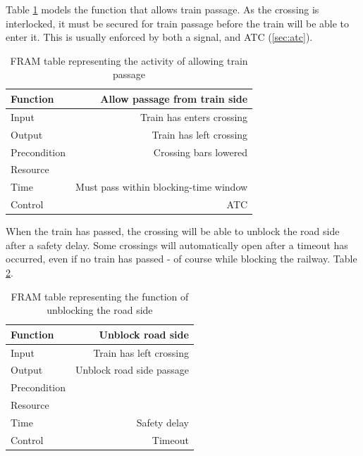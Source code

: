 \documentclass[10pt,oneside]{book}                  %
\begin{document}
Table \ref{table:function_allow_passage_from_train_side} models the function that allows train passage. As the crossing is interlocked, it must be secured for train passage before the train will be able to enter it. This is usually enforced by both a signal, and ATC (\ref{sec:atc}).

\begin{table}[h]
\centering
    \begin{tabular}{ | l | r | }
    \hline
    Function     &  Allow passage from train side \\ \hline \hline
    Input        &  Train has enters crossing\\ \hline
    Output       &  Train has left crossing\\ \hline
    Precondition &  Crossing bars lowered\\ \hline
    Resource     &  \\ \hline
    Time         &  Must pass within blocking-time window\\ \hline
    Control      &  ATC\\ \hline
    \end{tabular}
\caption{FRAM table representing the activity of allowing train passage}
\label{table:function_allow_passage_from_train_side}
\end{table}
When the train has passed, the crossing will be able to unblock the road side after a safety delay. Some crossings will automatically open after a timeout has occurred, even if no train has passed - of course while blocking the railway. Table \ref{table:function_unblock_road_side}.
\begin{table}[h]
\centering
    \begin{tabular}{ | l | r | }
    \hline
    Function     &  Unblock road side \\ \hline \hline
    Input        &  Train has left crossing\\ \hline
    Output       &  Unblock road side passage\\ \hline
    Precondition &  \\ \hline
    Resource     &  \\ \hline
    Time         &  Safety delay\\ \hline
    Control      &  Timeout\\ \hline
    \end{tabular}
\caption{FRAM table representing the function of unblocking the road side}
\label{table:function_unblock_road_side}
\end{table}
\end{document}
